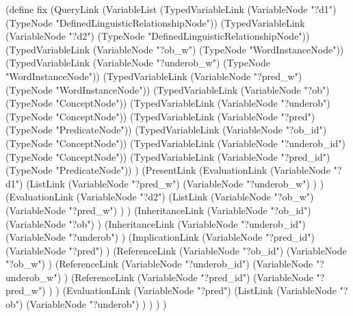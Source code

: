 \begin{python}
(define fix
  (QueryLink
    (VariableList
      (TypedVariableLink 
        (VariableNode "?d1") 
        (TypeNode "DefinedLinguisticRelationshipNode"))
      (TypedVariableLink 
        (VariableNode "?d2") 
        (TypeNode "DefinedLinguisticRelationshipNode"))
      (TypedVariableLink 
        (VariableNode "?ob_w") 
        (TypeNode "WordInstanceNode"))
      (TypedVariableLink 
        (VariableNode "?underob_w") 
        (TypeNode "WordInstanceNode"))
      (TypedVariableLink 
        (VariableNode "?pred_w") 
        (TypeNode "WordInstanceNode"))
      (TypedVariableLink 
        (VariableNode "?ob") 
        (TypeNode "ConceptNode"))
      (TypedVariableLink 
        (VariableNode "?underob") 
        (TypeNode "ConceptNode"))
      (TypedVariableLink 
        (VariableNode "?pred") 
        (TypeNode "PredicateNode"))
      (TypedVariableLink 
        (VariableNode "?ob_id") 
        (TypeNode "ConceptNode"))
      (TypedVariableLink 
        (VariableNode "?underob_id") 
        (TypeNode "ConceptNode"))
      (TypedVariableLink 
        (VariableNode "?pred_id") 
        (TypeNode "PredicateNode"))
    )
    (PresentLink
      (EvaluationLink
        (VariableNode "?d1")
        (ListLink
          (VariableNode "?pred_w")
          (VariableNode "?underob_w")
        )
      )
      (EvaluationLink
        (VariableNode "?d2")
        (ListLink
          (VariableNode "?ob_w")
          (VariableNode "?pred_w")
        )
      )
      (InheritanceLink
        (VariableNode "?ob_id")
        (VariableNode "?ob")
      )
      (InheritanceLink
        (VariableNode "?underob_id")
        (VariableNode "?underob")
      )
      (ImplicationLink
        (VariableNode "?pred_id")
        (VariableNode "?pred")
      )
      (ReferenceLink
        (VariableNode "?ob_id")
        (VariableNode "?ob_w")
      )
      (ReferenceLink
        (VariableNode "?underob_id")
        (VariableNode "?underob_w")
      )
      (ReferenceLink
        (VariableNode "?pred_id")
        (VariableNode "?pred_w")
      )
    )
    (EvaluationLink
      (VariableNode "?pred")
      (ListLink
        (VariableNode "?ob")
        (VariableNode "?underob")
      )
    )
  )
)
\end{python}